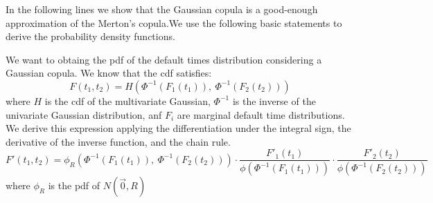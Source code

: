 \documentclass[11pt,fleqn]{book} %
\begin{document}

In the following lines we show that the Gaussian copula is a good-enough
approximation of the Merton's copula.We use the following basic statements
to derive the probability density functions.

We want to obtaing the pdf of the default times distribution considering 
a Gaussian copula. We know that the cdf satisfies:
\begin{displaymath}
	F(t_1,t_2) = H\left( \Phi^{-1}(F_1(t_1)),\ \Phi^{-1}(F_2(t_2)) \right)
\end{displaymath}
where $H$ is the cdf of the multivariate Gaussian,  $\Phi^{-1}$ is the inverse 
of the univariate Gaussian distribution, anf $F_i$ are marginal default time
distributions. We derive this expression applying the differentiation under
the integral sign, the derivative of the inverse function, and the chain rule.
\begin{displaymath}
	F'(t_1,t_2) = \phi_{R}\left(
	\Phi^{-1}(F_1(t_1)),\ \Phi^{-1}(F_2(t_2))
	\right) 
	\cdot
	\frac{F'_1(t_1)}{\phi(\Phi^{-1}(F_1(t_1)))}
	\cdot
	\frac{F'_2(t_2)}{\phi(\Phi^{-1}(F_2(t_2)))}
\end{displaymath}
where $\phi_{R}$ is the pdf of $N(\vec{0},R)$
\end{document}
